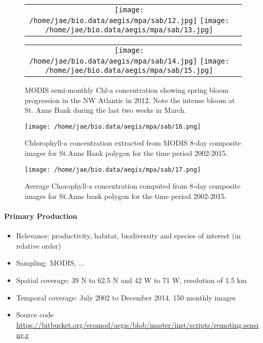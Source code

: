\documentclass[letterpaper,portrait,11pt]{scrartcl}
\numberwithin{equation}{section}    %
\numberwithin{figure}{section}    %
\numberwithin{table}{section}       %
\begin{document}
\begin{figure}[ht]

  \centering
  \begin{tabular}{cc}
    \texttt{[image: /home/jae/bio.data/aegis/mpa/sab/12.jpg]}
    \texttt{[image: /home/jae/bio.data/aegis/mpa/sab/13.jpg]}
  \end{tabular}
  \begin{tabular}{cc}
    \texttt{[image: /home/jae/bio.data/aegis/mpa/sab/14.jpg]}
    \texttt{[image: /home/jae/bio.data/aegis/mpa/sab/15.jpg]}
  \end{tabular}
  \caption{MODIS semi-monthly Chl-a concentration showing spring bloom progression in the NW Atlantic in 2012. Note the intense bloom at St. Anns Bank during the last two weeks in March.}
  \label{fig:MapChlaBloomSpring}
\end{figure}


\begin{figure}[h]
 
  \centering
  \texttt{[image: /home/jae/bio.data/aegis/mpa/sab/16.png]}
  \caption{Chlorophyll-a concentration extracted from MODIS 8-day composite images for St.Anns Bank polygon for the time period 2002-2015.}
  \label{fig:modisChlaTS}
\end{figure}


\begin{figure}[h]

  \centering
  \texttt{[image: /home/jae/bio.data/aegis/mpa/sab/17.png]}
  \caption {Average Chorophyll-a concentration computed from 8-day composite images for St.Anns bank polygon for the time period 2002-2015. }
  \label{fig:ChlaSeasonal}
\end{figure}



\afterpage{\clearpage}
\paragraph{Primary Production}

\begin{itemize}
  \item Relevance:  productivity, habitat, biodiversity and species of interest (in relative order)
  \item Sampling:  MODIS, ...
  \item Spatial coverage: 39 N to 62.5 N and 42 W to 71 W, resolution of 1.5 km
  \item Temporal coverage: July 2002 to December 2014, 150 monthly  images
  \item Source code \url{https://bitbucket.org/ecomod/aegis/blob/master/inst/scripts/remoting.sensing.r}
\end{itemize}
\end{document}
